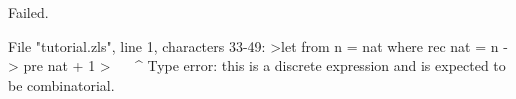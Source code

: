 \runverbatimfalse
{}
\begin{RunVerbatimMsg}
Failed.
\end{RunVerbatimMsg}
\begin{RunVerbatimErr}
File "tutorial.zls", line 1, characters 33-49:
>let from n = nat where rec nat = n -> pre nat + 1
>                                 ^^^^^^^^^^^^^^^^
Type error: this is a discrete expression and is expected to be combinatorial.
\end{RunVerbatimErr}
